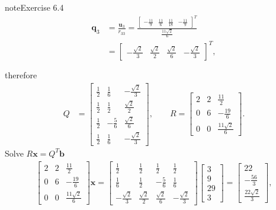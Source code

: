 \documentclass[letterpaper,10pt,english]{jupyterBook}
\begin{document}
\begin{sphinxadmonition}{note}{Exercise 6.4}
\begin{align*}
    \mathbf{q}_{3} &= \frac{\mathbf{u}_{3}}{r_{33}} = \frac{\left[\begin{matrix}- \frac{11}{9} & \frac{11}{6} & \frac{11}{18} & - \frac{11}{9}\end{matrix}\right]^T}{\frac{11 \sqrt{2}}{6}} \\
    &= \left[\begin{matrix}- \frac{\sqrt{2}}{3} & \frac{\sqrt{2}}{2} & \frac{\sqrt{2}}{6} & - \frac{\sqrt{2}}{3}\end{matrix}\right]^T, \\
     \\
\end{align*}
\sphinxAtStartPar
therefore
\begin{align*}
    Q &= \left[\begin{matrix}\frac{1}{2} & \frac{1}{6} & - \frac{\sqrt{2}}{3}\\\frac{1}{2} & \frac{1}{2} & \frac{\sqrt{2}}{2}\\\frac{1}{2} & - \frac{5}{6} & \frac{\sqrt{2}}{6}\\\frac{1}{2} & \frac{1}{6} & - \frac{\sqrt{2}}{3}\end{matrix}\right], \qquad R = \left[\begin{matrix}2 & 2 & \frac{11}{2}\\0 & 6 & - \frac{19}{6}\\0 & 0 & \frac{11 \sqrt{2}}{6}\end{matrix}\right].
\end{align*}
\sphinxAtStartPar
Solve \(R \mathbf{{x}} = Q^T \mathbf{{b}}\)
\begin{align*}
    \left[\begin{matrix}2 & 2 & \frac{11}{2}\\0 & 6 & - \frac{19}{6}\\0 & 0 & \frac{11 \sqrt{2}}{6}\end{matrix}\right] \mathbf{x} = \left[\begin{matrix}\frac{1}{2} & \frac{1}{2} & \frac{1}{2} & \frac{1}{2}\\\frac{1}{6} & \frac{1}{2} & - \frac{5}{6} & \frac{1}{6}\\- \frac{\sqrt{2}}{3} & \frac{\sqrt{2}}{2} & \frac{\sqrt{2}}{6} & - \frac{\sqrt{2}}{3}\end{matrix}\right]\left[\begin{matrix}3\\9\\29\\3\end{matrix}\right] = \left[\begin{matrix}22\\- \frac{56}{3}\\\frac{22 \sqrt{2}}{3}\end{matrix}\right],

\end{align*}
\end{sphinxadmonition}
\end{document}
